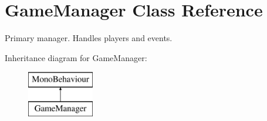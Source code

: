 \hypertarget{class_game_manager}{}\section{Game\+Manager Class Reference}
\label{class_game_manager}


Primary manager. Handles players and events.  


Inheritance diagram for Game\+Manager\+:\begin{figure}[H]
\begin{center}
\leavevmode
\includegraphics[height=2.000000cm]{class_game_manager}
\end{center}
\end{figure}
